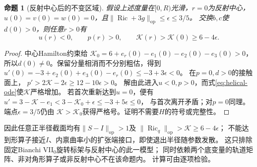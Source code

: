 \documentclass[UTF8,a4paper,11pt,fontset=fandol]{ctexart}
\numberwithin{equation}{section}
\newtheorem{proposition}[theorem]{命题}
\theoremstyle{definition}
\newcommand{\Ric}{\operatorname{Ric}}
\newcommand{\op}{\mathrm{op}}
\begin{document}
\begin{proposition}[反射中心后的不变区域]\label{prop:helical}
假设上述度量在$[0,R)$光滑，$r=0$为反射中心，
$u(0)=v(0)=w(0)=0$，且$\|\Ric+3g\|_{\op}\le\epsilon\le3/5$。
交换$b,c$使$d(0)>0$，则任意$r>0$有
\[
 u(r)<0,\qquad p(r)>0,\qquad
 \mathcal K(r)>\mathcal K(0)\ge6-4\epsilon.
\]
\end{proposition}
\begin{proof}
中心Hamilton约束给
$\mathcal K_0=6+e_r(0)-e_1(0)-e_2(0)-e_3(0)>0$，
所以$d(0)\ne0$。保留分量相消而不分别粗估，得到
$u'(0)=-3+e_2(0)+e_3(0)-e_r(0)\le-3+3\epsilon<0$。
在$p=0,d>0$的接触面上，
$p'>2\mathcal K-2\epsilon\ge12-10\epsilon>0$。
解由此进入$u<0,p>0$，而式\eqref{eq:helical-ode}使$\mathcal K$严格增加。
若首次重新达到$u=0$，便有
$u'=3-\mathcal K-e_1<3-\mathcal K_0+\epsilon\le-3+5\epsilon\le0$，
与首次离开矛盾；对$p=0$同理。端点$\epsilon=3/5$仍由
$\mathcal K>\mathcal K_0$获得严格号。证明不需要$H$的符号或完整性。
\end{proof}
因此任意正半径截面均有$\|S-I\|_{\op}>1$及
$\|\Ric_q\|_{\op}>\mathcal K\ge6-4\epsilon$；
不能达到形算子接近$I$、内禀曲率小的扩张端接口，即使退出半径随参数发散。
这只排除固定Bianchi VII$_0$旋转标架与反射中心的此一模型；
同时依赖两个底变量的轨道矩阵、非对角形算子或非反射中心不在该命题内。
计算可由逐项检验。
\end{document}
